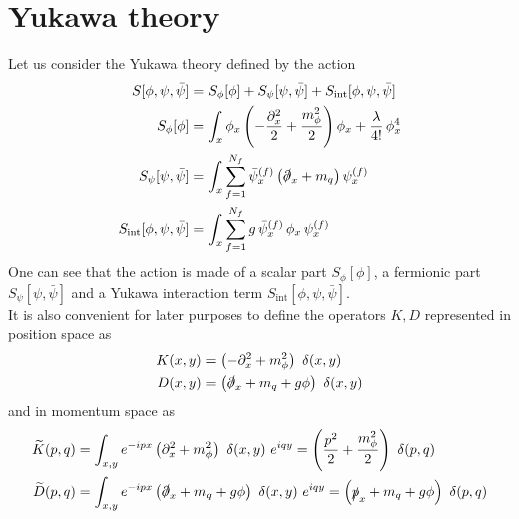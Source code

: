\section{Yukawa theory}
\label{sec:Yukawa_theory}
Let us consider the Yukawa theory defined by the action
\begin{equation}
\begin{aligned}
    S[\phi,\psi,\bar\psi] &= S_\phi[\phi] + S_\psi[\psi, \bar\psi] + S_\text{int}[\phi, \psi, \bar\psi]\\
     S_\phi[\phi] &= \int_x \phi_x \left(-\frac{\partial^2_x}{2} + \frac{m_\phi^2}{2}\right) \phi_x + \frac{\lambda}{4!} \, \phi_x^4 \\
     S_\psi[\psi, \bar\psi] &= \int_x \sum_{f=1}^{N_f} \bar \psi_x^{(f)} \left(\slashed{\partial}_x + m_q \right) \psi_x^{(f)} \\
     S_\text{int}[\phi, \psi, \bar\psi] &= \int_x \sum_{f=1}^{N_f} g \, \bar \psi_x^{(f)} \, \phi_x \, \psi_x^{(f)}
    \label{eq:full_action_continuum}
\end{aligned}
\end{equation}
One can see that the action is made of a scalar part $S_\phi[\phi]$, a fermionic part $S_\psi[\psi, \bar\psi]$ and a Yukawa interaction term $S_\text{int}[\phi, \psi, \bar\psi]$. \\
It is also convenient for later purposes to define the operators $K, D$ represented in position space as 
\begin{equation}
    \begin{aligned}
        K(x, y) &=  \left(-\partial^2_x + m_\phi^2\right) \ \delta(x,y) \\
        D(x, y) &= \left(\slashed{\partial}_x + m_q + g\phi \right) \ \delta(x,y)
    \end{aligned}
    \label{eq:definition_kinetic_terms_continuum_position}
\end{equation}
and in momentum space as
\begin{equation}
    \begin{aligned}
        \widetilde{K}(p, q) &=  \int_{x,y} e^{-ipx} \left(\partial^2_x + m_\phi^2\right) \ \delta(x,y) \ e^{iqy} = \left(\frac{p^2}{2} + \frac{m_\phi^2}{2}\right) \ \delta(p,q) \\
        \widetilde{D}(p, q) &= \int_{x,y} e^{-ipx} \left(\slashed{\partial}_x + m_q + g\phi \right) \ \delta(x,y) \ e^{iqy} = \left(\slashed{p}_x + m_q + g\phi \right) \ \delta(p,q)
    \end{aligned}
    \label{eq:definition_kinetic_terms_continuum_momentum}
\end{equation}
